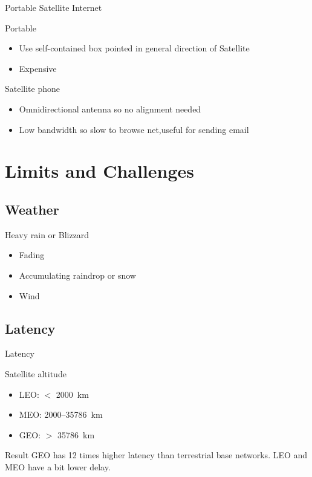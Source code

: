 \documentclass[pdf]{beamer}
\begin{document}
\begin{frame}{Portable Satellite Internet}
  \begin{block}{Portable}
    \begin{itemize}
      \item Use self-contained box pointed in general direction of Satellite
      \item Expensive
    \end{itemize}
  \end{block}
  \begin{block}{Satellite phone}
    \begin{itemize}
      \item Omnidirectional antenna so no alignment needed
      \item Low bandwidth so slow to browse net,useful for sending email
    \end{itemize}
  \end{block}
\end{frame}

\section{Limits and Challenges}
\frame{\tableofcontents[currentsection]}

\subsection{Weather}
\begin{frame}{Heavy rain or Blizzard}\LARGE
  \begin{itemize}
    \item Fading
    \item Accumulating raindrop or snow
    \item Wind
  \end{itemize}
\end{frame}

\subsection{Latency}
\begin{frame}{Latency}\large
  \begin{block}{Satellite altitude}
    \begin{itemize}
      \item LEO: $<$ \SI{2000}{\kilo\meter}
      \item MEO: 2000--\SI{35786}{\kilo\meter}
      \item GEO: $>$ \SI{35786}{\kilo\meter}
    \end{itemize}
  \end{block}
  \begin{block}{Result}
    GEO has 12 times higher latency than terrestrial base networks.
    LEO and MEO have a bit lower delay.
  \end{block}
\end{frame}
\end{document}
